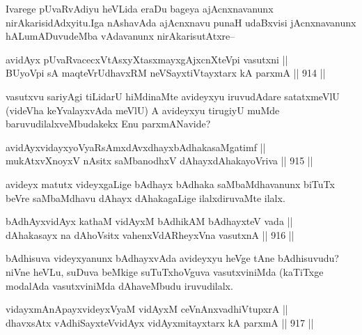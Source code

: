 \begin{artha}
Ivarege pUvaRvAdiyu heVLida eraDu bageya ajAcnxnavanunx nirAkarisidAdxyitu.Iga nAshavAda ajAcnxnavu  punaH udaBxvisi jAcnxnavanunx hALumADuvudeMba vAdavanunx nirAkarisutAtxre{\rm --}
\end{artha}

\begin{shl}
avidAyx pUvaRvacecxVtAsxyXtasxmayxgAjxcnXteV\s pi vasutxni || \\
BUyoV\s pi sA maqteVrUdhavxRM neVSayxtiVtayxtarx kA parxmA \hfill || 914 ||  
\end{shl}

\begin{artha}
vasutxvu sariyAgi tiLidarU hiMdinaMte avideyxyu iruvudAdare satatxmeVlU (videVha keYvalayxvAda meVlU) A avideyxyu tirugiyU muMde baruvudilalxveMbudakekx Enu parxmANavide?
\end{artha}

\begin{shl}
avidAyxvidayxyoVyaRsAmxdAvxdhayxbAdhakasaMgatimf || \\
mukAtxvX\s noyxV nAsitx saMbanodhxV dAhayxdAhakayoVriva \hfill || 915 || 
\end{shl}

\begin{artha}
avideyx matutx videyxgaLige bAdhayx bAdhaka saMbaMdhavanunx biTuTx beVre saMbaMdhavu dAhayx dAhakagaLige ilalxdiruvaMte ilalx.
\end{artha}


\begin{shl}
bAdhAyx\s vidAyx kathaM vidAyxM bAdhikAM bAdhayxteV vada ||  \\
dAhakasayx na dAhoV\s sitx vahenxVdARheyxVna vasutxnA \hfill || 916 ||  
\end{shl}

\begin{artha}
bAdhisuva videyxyanunx bAdhayxvAda avideyxyu heVge tAne bAdhisuvudu? niVne heVLu, suDuva beMkige suTuTxhoVguva vasutxviniMda (kaTiTxge modalAda vasutxviniMda dAhaveMbudu iruvudilalx.
\end{artha}


\begin{shl}
vidayxmAnA\s payxvideyxVyaM vidAyxM ceVnAnxvadhiVtupxrA || \\
dhavxsAtx vAdhiSayxteV\s vidAyx vidAyxmitayxtarx kA parxmA \hfill || 917 ||  
\end{shl}

